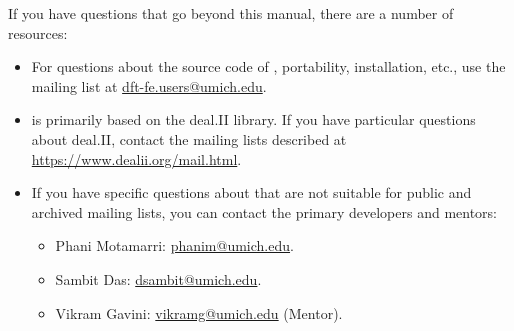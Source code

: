 If you have questions that go beyond this manual, there are a number of
resources:
\begin{itemize}
\item For questions about the source code of \dftfe{}, portability, installation,
  etc., use the \dftfe{} mailing list at
  \url{dft-fe.users@umich.edu}.

\item \dftfe{} is primarily based on the deal.II library. If you have particular questions
  about deal.II, contact
  the mailing lists described at \url{https://www.dealii.org/mail.html}.

\item If you have specific questions about \dftfe{} that are not suitable
  for public and archived mailing lists, you can contact the
  primary developers and mentors:
  \begin{itemize}
  \item Phani Motamarri: \url{phanim@umich.edu}.
  \item Sambit Das: \url{dsambit@umich.edu}.
  \item Vikram Gavini: \url{vikramg@umich.edu} (Mentor).
  \end{itemize}
\end{itemize}
